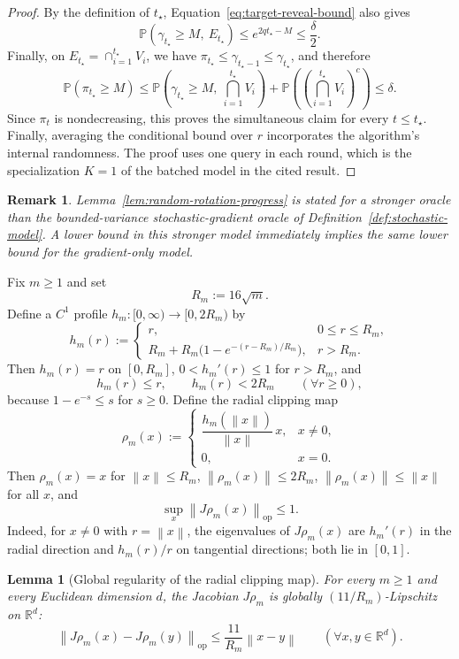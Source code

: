 \documentclass[11pt]{article}
\newtheorem{lemma}[theorem]{Lemma}
\newtheorem{remark}[theorem]{Remark}
\newcommand{\R}{\mathbb{R}}
\newcommand{\Pbb}{\mathbb{P}}
\newcommand{\norm}[1]{\left\lVert #1\right\rVert}
\begin{document}
\begin{proof}
By the definition of \(t_\star\), Equation~\eqref{eq:target-reveal-bound} also gives
\[
\Pbb(\gamma_{t_\star}\ge M,\ E_{t_\star})
\le e^{2qt_\star-M}
\le\frac\delta2.
\]
Finally,
on \(E_{t_\star}=\cap_{i=1}^{t_\star}V_i\), we have
\(\pi_{t_\star}\le\gamma_{t_\star-1}\le\gamma_{t_\star}\), and therefore
\[
\Pbb(\pi_{t_\star}\ge M)
\le
\Pbb\left(\gamma_{t_\star}\ge M,\ \bigcap_{i=1}^{t_\star}V_i\right)
+
\Pbb\left(\left(\bigcap_{i=1}^{t_\star}V_i\right)^c\right)
\le\delta.
\]
Since $\pi_t$ is nondecreasing, this proves the simultaneous claim for every $t\le t_\star$. Finally, averaging the
conditional bound over $r$ incorporates the algorithm's internal randomness. The proof uses one query in each round,
which is the specialization $K=1$ of the batched model in the cited result.
\end{proof}

\begin{remark}
Lemma~\ref{lem:random-rotation-progress} is stated for a stronger oracle than the bounded-variance stochastic-gradient
oracle of Definition~\ref{def:stochastic-model}. A lower bound in this stronger model immediately implies the same
lower bound for the gradient-only model.
\end{remark}

Fix $m\ge 1$ and set
\[
R_m:=16\sqrt m.
\]
Define a $C^1$ profile $h_m:[0,\infty)\to [0,2R_m)$ by
\[
h_m(r):=
\begin{cases}
r, & 0\le r\le R_m,\\[0.3em]
R_m+R_m\bigl(1-e^{-(r-R_m)/R_m}\bigr), & r>R_m.
\end{cases}
\]
Then $h_m(r)=r$ on $[0,R_m]$, $0<h_m'(r)\le 1$ for $r>R_m$, and
\[
h_m(r)\le r,
\qquad
h_m(r)<2R_m
\qquad
(\forall r\ge 0),
\]
because $1-e^{-s}\le s$ for $s\ge 0$.
Define the radial clipping map
\[
\rho_m(x):=
\begin{cases}
\dfrac{h_m(\norm{x})}{\norm{x}}\,x, & x\neq 0,\\[0.8em]
0, & x=0.
\end{cases}
\]
Then $\rho_m(x)=x$ for $\norm{x}\le R_m$, $\norm{\rho_m(x)}\le 2R_m$, $\norm{\rho_m(x)}\le \norm{x}$ for all $x$, and
\[
\sup_x \norm{J\rho_m(x)}_{\mathrm{op}}\le 1.
\]
Indeed, for $x\neq 0$ with $r=\norm{x}$, the eigenvalues of $J\rho_m(x)$ are $h_m'(r)$ in the radial direction and $h_m(r)/r$ on tangential directions; both lie in $[0,1]$.

\begin{lemma}[Global regularity of the radial clipping map]
\label{lem:radial-clipping}
For every $m\ge 1$ and every Euclidean dimension \(d\), the Jacobian $J\rho_m$ is globally
$(11/R_m)$-Lipschitz on \(\R^d\):
\[
\norm{J\rho_m(x)-J\rho_m(y)}_{\mathrm{op}}\le \frac{11}{R_m}\norm{x-y}
\qquad
(\forall x,y\in\R^d).
\]
\end{lemma}
\end{document}
